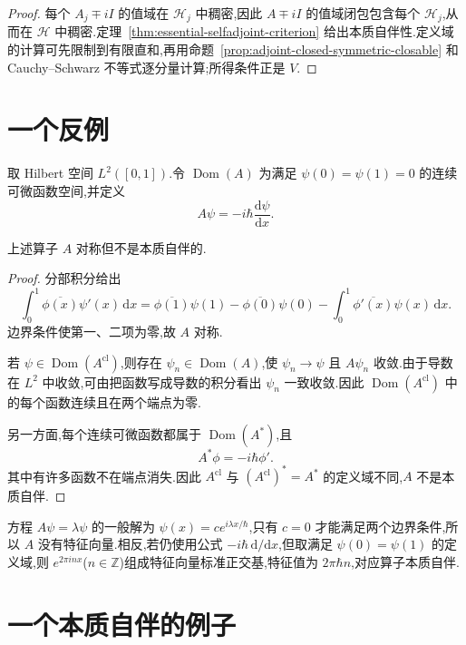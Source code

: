\begin{proof}
每个 \(A_{j}\mp iI\) 的值域在 \(\mathcal{H}_{j}\) 中稠密,因此 \(A\mp iI\) 的值域闭包包含每个 \(\mathcal{H}_{j}\),从而在 \(\mathcal{H}\) 中稠密.定理~\ref{thm:essential-selfadjoint-criterion} 给出本质自伴性.定义域的计算可先限制到有限直和,再用命题~\ref{prop:adjoint-closed-symmetric-closable} 和 Cauchy--Schwarz 不等式逐分量计算;所得条件正是 \(V\).
\end{proof}

\section{一个反例}
\label{sec:counterexample-unbounded}

取 Hilbert 空间 \(L^{2}([0,1])\).令 \(\operatorname{Dom}(A)\) 为满足 \(\psi(0)=\psi(1)=0\) 的连续可微函数空间,并定义
\[
A\psi=-i\hbar\frac{\mathrm{d}\psi}{\mathrm{d}x}.
\]

\begin{proposition}[有限区间上的错误边界条件]\label{prop:finite-interval-counterexample}
上述算子 \(A\) 对称但不是本质自伴的.
\end{proposition}

\begin{proof}
分部积分给出
\[
\int_{0}^{1}\overline{\phi(x)}\psi'(x)\,\mathrm{d}x
=\overline{\phi(1)}\psi(1)-\overline{\phi(0)}\psi(0)
-\int_{0}^{1}\overline{\phi'(x)}\psi(x)\,\mathrm{d}x.
\]
边界条件使第一、二项为零,故 \(A\) 对称.

若 \(\psi\in\operatorname{Dom}(A^{\mathrm{cl}})\),则存在 \(\psi_{n}\in\operatorname{Dom}(A)\),使 \(\psi_{n}\to\psi\) 且 \(A\psi_{n}\) 收敛.由于导数在 \(L^{2}\) 中收敛,可由把函数写成导数的积分看出 \(\psi_{n}\) 一致收敛.因此 \(\operatorname{Dom}(A^{\mathrm{cl}})\) 中的每个函数连续且在两个端点为零.

另一方面,每个连续可微函数都属于 \(\operatorname{Dom}(A^{*})\),且
\[
A^{*}\phi=-i\hbar\phi'.
\]
其中有许多函数不在端点消失.因此 \(A^{\mathrm{cl}}\) 与 \((A^{\mathrm{cl}})^{*}=A^{*}\) 的定义域不同,\(A\) 不是本质自伴.
\end{proof}

方程 \(A\psi=\lambda\psi\) 的一般解为 \(\psi(x)=ce^{i\lambda x/\hbar}\),只有 \(c=0\) 才能满足两个边界条件,所以 \(A\) 没有特征向量.相反,若仍使用公式 \(-i\hbar\,\mathrm{d}/\mathrm{d}x\),但取满足 \(\psi(0)=\psi(1)\) 的定义域,则 \(e^{2\pi inx}\)(\(n\in\mathbb{Z}\))组成特征向量标准正交基,特征值为 \(2\pi\hbar n\),对应算子本质自伴.

\section{一个本质自伴的例子}
\label{sec:essential-selfadjoint-example}

